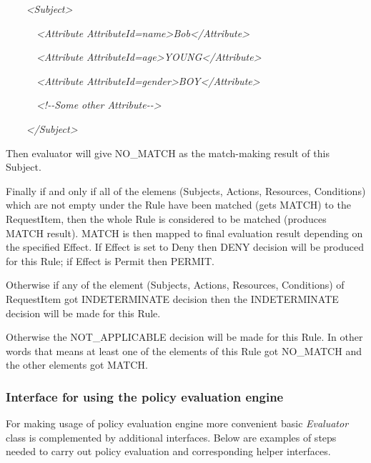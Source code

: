 \documentclass{article}
\begin{document}
{\itshape\color{black}
\ \ \ \ {\textless}Subject{\textgreater}}

{\itshape\color{black}
\ \ \ \ \ \ {\textless}Attribute
AttributeId={\textquotedbl}name{\textquotedbl}{\textgreater}Bob{\textless}/Attribute{\textgreater}}

{\itshape\color{black}
\ \ \ \ \ \ {\textless}Attribute
AttributeId={\textquotedbl}age{\textgreater}YOUNG{\textless}/Attribute{\textgreater}}

{\itshape\color{black}
\ \ \ \ \ \ {\textless}Attribute
AttributeId={\textquotedbl}gender{\textquotedbl}{\textgreater}BOY{\textless}/Attribute{\textgreater}}

{\itshape\color{black}
\ \ \ \ \ \ {\textless}!-{}-Some other Attribute-{}-{\textgreater}}

{\itshape\color{black}
\ \ \ \ {\textless}/Subject{\textgreater}}

{\color{black}
Then evaluator will give NO\_MATCH as the match-making result of this
Subject.}

{\color{black}
Finally if and only if all of the elemens (Subjects, Actions, Resources,
Conditions) which are not empty under the Rule have been matched (gets
MATCH) to the RequestItem, then the whole Rule is considered to be
matched (produces MATCH result). MATCH is then mapped to final
evaluation result depending on the specified Effect. If Effect is set
to Deny then DENY decision will be produced for this Rule; if Effect is
Permit then PERMIT.}

{\color{black}
Otherwise if any of the element (Subjects, Actions, Resources,
Conditions) of RequestItem got INDETERMINATE decision then the
INDETERMINATE decision will be made for this Rule.}

{\color{black}
Otherwise the NOT\_APPLICABLE decision will be made for this Rule. In
other words that means at least one of the elements of this Rule got
NO\_MATCH and the other elements got MATCH.}

\subsubsection{Interface for using the policy evaluation engine}
{\upshape\color{black}
For making usage of policy evaluation engine more convenient basic
\textit{Evaluator} class is complemented by additional interfaces.
Below are examples of steps needed to carry out policy evaluation and
corresponding helper interfaces.}
\end{document}
